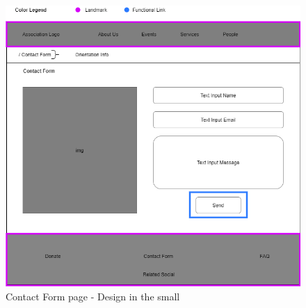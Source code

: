 \begin{figure}[h!]
	\centering
	\begin{minipage}[b]{1\textwidth}
    		\includegraphics[width=\textwidth]{./assets/contactform.png}
		\caption{Contact Form page - Design in the small}
	\end{minipage}
\end{figure}
\FloatBarrier
